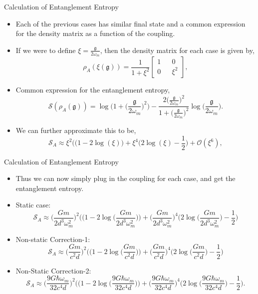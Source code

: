 \documentclass[12pt,aspectratio=1610]{beamer}
\newcommand{\g}{\mathfrak{g}}
\begin{document}
\begin{frame}{Calculation of Entanglement Entropy}
    \begin{itemize}
        \item Each of the previous cases has similar final state and a common expression for the density matrix as a function of the coupling.
        \item If we were to define $\xi = \frac{\g}{2\omega_m}$, then the density matrix for each case is given by,
        \begin{equation*}
    \rho_A(\xi(\mathfrak{g})) = \frac{1}{1+\xi^2}\begin{bmatrix}
        1 && 0\\
        0 && \xi^2
    \end{bmatrix},
\end{equation*}
    \item Common expression for the entanglement entropy,
    $$\mathcal{S}(\rho_A(\mathfrak{g})) = \log\Bigg(1+ \Big(\frac{\mathfrak{g}}{2\omega_{m}}\Big)^2\Bigg) - \frac{2\Big(\frac{\mathfrak{g}}{2\omega_{m}}\Big)^2}{1+\Big(\frac{\mathfrak{g}}{2\omega_{m}}\Big)^2}\log\Big(\frac{\mathfrak{g}}{2\omega_{m}}\Big).$$
    \item We can further approximate this to be,
    \begin{equation*}
    \mathcal{S}_A \approx {\xi}^2 \Big((1 - 2\log(\xi)\Big) + \xi^4 \Big(2\log(\xi) - \frac{1}{2}\Big) + \mathcal{O}(\xi^6),
\end{equation*}
    \end{itemize}
\end{frame}

\begin{frame}{Calculation of Entanglement Entropy}
    \begin{itemize}
        \item Thus we can now simply plug in the coupling for each case, and get the entanglement entropy.
        \item Static case:
        \begin{equation*}
    \mathcal{S}_A \approx \Big({\frac{Gm}{2d^3\omega_m^2}}\Big)^2 \Big((1 - 2\log\Big({\frac{Gm}{2d^3\omega_m^2}}\Big)\Big) + \Big({\frac{Gm}{2d^3\omega_m^2}}\Big)^4 \Big(2\log\Big({\frac{Gm}{2d^3\omega_m^2}}\Big) - \frac{1}{2}\Big)
\end{equation*}
\item Non-static Correction-1:
$$\mathcal{S}_A \approx \Big(\frac{Gm}{c^2d}\Big)^2 \Big((1 - 2\log\Big(\frac{Gm}{c^2d}\Big)\Big) + \Big(\frac{Gm}{c^2d}\Big)^4 \Big(2\log\Big(\frac{Gm}{c^2d}\Big) - \frac{1}{2}\Big)$$
\item Non-Static Correction-2:
$$\mathcal{S}_A \approx \Big(\frac{9G\hbar\omega_m}{32c^4d}\Big)^2 \Big((1 - 2\log\Big(\frac{9G\hbar\omega_m}{32c^4d}\Big)\Big) + \Big(\frac{9G\hbar\omega_m}{32c^4d}\Big)^4 \Big(2\log\Big(\frac{9G\hbar\omega_m}{32c^4d}\Big) - \frac{1}{2}\Big).$$
    \end{itemize}
\end{frame}
\end{document}
